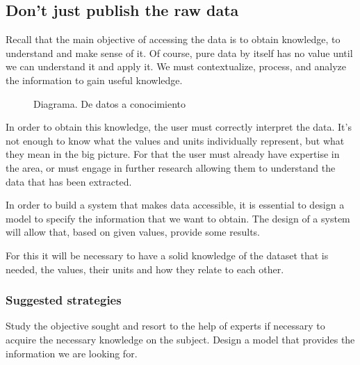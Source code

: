 \subsection{Don't just publish the raw data}

Recall that the main objective of accessing the data is to obtain knowledge, to understand and make sense of it. Of course, 
pure data by itself has no value until we can understand it and apply it. We must contextualize, process, and analyze the 
information to gain useful knowledge. \\
    
\begin{figure}[ht]
    \centering 
    \caption{Diagrama. De datos a conocimiento}
\end{figure}
 
In order to obtain this knowledge, the user must correctly interpret the data. It's not enough to know what the values and 
units individually represent, but what they mean in the big picture. For that the user must already have expertise in the 
area, or must engage in further research allowing them to understand the data that has been extracted.
    
In order to build a system that makes data accessible, it is essential to design a model to specify the
information that we want to obtain. The design of a system will allow that, based on given values, provide some results.

For this it will be necessary to have a solid knowledge of the dataset that is needed, the values, their units and how they relate to each other.

\subsubsection*{Suggested strategies} 

Study the objective sought and resort to the help of experts if necessary to acquire the necessary knowledge
on the subject. Design a model that provides the information we are looking for.

